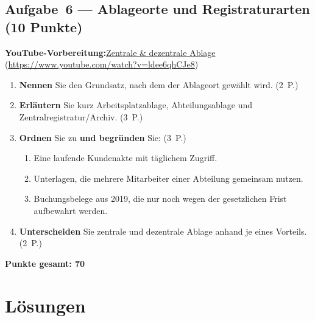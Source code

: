 \documentclass[11pt, a4paper]{article}
\begin{document}
\subsection*{Aufgabe~6 --- Ablageorte und Registraturarten (10 Punkte)}

\noindent\textbf{\color{bfwAccent}YouTube-Vorbereitung:}\enspace \href{https://www.youtube.com/watch?v=ldee6qhCJe8}{Zentrale \& dezentrale Ablage} (\url{https://www.youtube.com/watch?v=ldee6qhCJe8})

\medskip
\begin{enumerate}[label=(\alph*)]
  \item \textbf{Nennen} Sie den Grundsatz, nach dem der Ablageort gewählt wird. \hfill (2~P.)
  \item \textbf{Erläutern} Sie kurz Arbeitsplatzablage, Abteilungsablage und Zentralregistratur/Archiv. \hfill (3~P.)
  \item \textbf{Ordnen} Sie zu \textbf{und begründen} Sie: \hfill (3~P.)
    \begin{enumerate}[label=\arabic*., leftmargin=*]
      \item Eine laufende Kundenakte mit täglichem Zugriff.
      \item Unterlagen, die mehrere Mitarbeiter einer Abteilung gemeinsam nutzen.
      \item Buchungsbelege aus 2019, die nur noch wegen der gesetzlichen Frist aufbewahrt werden.
    \end{enumerate}
  \item \textbf{Unterscheiden} Sie zentrale und dezentrale Ablage anhand je eines Vorteils. \hfill (2~P.)
\end{enumerate}

\vspace{1em}
\noindent\textbf{Punkte gesamt: 70}

\newpage

\section{Lösungen}\label{loesungen}
\end{document}
